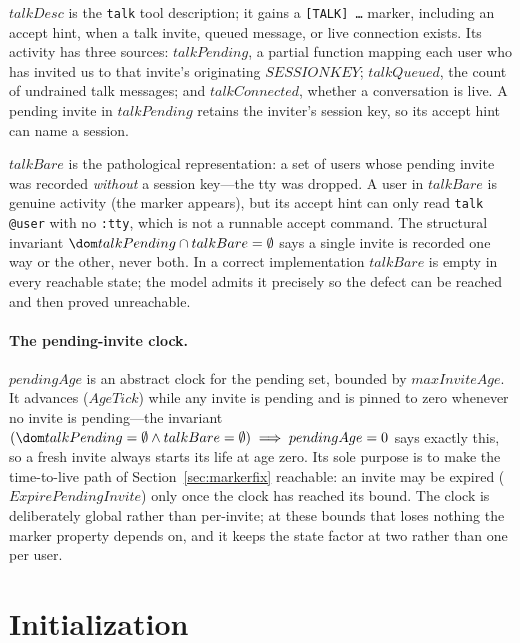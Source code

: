 \documentclass[a4paper,10pt,fleqn]{article}
\begin{document}
$talkDesc$ is the \texttt{talk} tool description; it gains a
\texttt{[TALK] \ldots} marker, including an accept hint, when a talk
invite, queued message, or live connection exists.  Its activity has
three sources: $talkPending$, a partial function mapping each user who
has invited us to that invite's originating $SESSIONKEY$; $talkQueued$,
the count of undrained talk messages; and $talkConnected$, whether a
conversation is live.  A pending invite in $talkPending$ retains the
inviter's session key, so its accept hint can name a session.

$talkBare$ is the pathological representation: a set of users whose
pending invite was recorded \emph{without} a session key---the tty was
dropped.  A user in $talkBare$ is genuine activity (the marker appears),
but its accept hint can only read \texttt{talk @user} with no
\texttt{:tty}, which is not a runnable accept command.  The structural
invariant $\dom talkPending \cap talkBare = \emptyset$ says a single
invite is recorded one way or the other, never both.  In a correct
implementation $talkBare$ is empty in every reachable state; the model
admits it precisely so the defect can be reached and then proved
unreachable.

\paragraph{The pending-invite clock.}  $pendingAge$ is an abstract clock
for the pending set, bounded by $maxInviteAge$.  It advances ($AgeTick$) while any invite is pending and is pinned to zero
whenever no invite is pending---the invariant
$(\dom talkPending = \emptyset \land talkBare = \emptyset) \implies
pendingAge = 0$ says exactly this, so a fresh invite always starts its
life at age zero.  Its sole purpose is to make the time-to-live path of
Section~\ref{sec:markerfix} reachable: an invite may be expired
($ExpirePendingInvite$) only once the clock has reached its bound.  The
clock is deliberately global rather than per-invite; at these bounds that
loses nothing the marker property depends on, and it keeps the state
factor at two rather than one per user.

\section{Initialization}
\end{document}

